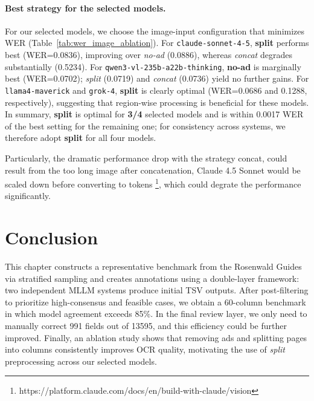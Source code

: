 \paragraph{Best strategy for the selected models.}
For our selected models, we choose the image-input configuration that minimizes WER (Table~\ref{tab:wer_image_ablation}).
For \texttt{claude-sonnet-4-5}, \textbf{split} performs best (WER=0.0836), improving over \emph{no-ad} (0.0886), whereas \emph{concat} degrades substantially (0.5234).
For \texttt{qwen3-vl-235b-a22b-thinking}, \textbf{no-ad} is marginally best (WER=0.0702); \emph{split} (0.0719) and \emph{concat} (0.0736) yield no further gains.
For \texttt{llama4-maverick} and \texttt{grok-4}, \textbf{split} is clearly optimal (WER=0.0686 and 0.1288, respectively), suggesting that region-wise processing is beneficial for these models.
In summary, \textbf{split} is optimal for \textbf{3/4} selected models and is within 0.0017 WER of the best setting for the remaining one; for consistency across systems, we therefore adopt \textbf{split} for all four models.

Particularly, the dramatic performance drop with the strategy concat, could result from the too long image after concatenation, Claude 4.5 Sonnet would be scaled down before converting to tokens \footnote{https://platform.claude.com/docs/en/build-with-claude/vision}, which could degrate the performance significantly. 

\section{Conclusion}
This chapter constructs a representative benchmark from the Rosenwald Guides via stratified sampling and creates annotations using a double-layer framework: two independent MLLM systems produce initial TSV outputs. After post-filtering to prioritize high-consensus and feasible cases, we obtain a 60-column benchmark in which model agreement exceeds 85\%. In the final review layer, we only need to manually correct 991 fields out of 13595, and this efficiency could be further improved. Finally, an ablation study shows that removing ads and splitting pages into columns consistently improves OCR quality, motivating the use of \textit{split} preprocessing across our selected models.
